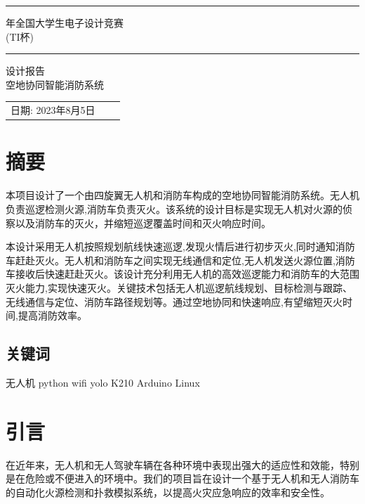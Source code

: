 \documentclass[12pt, a4paper, oneside]{article}
\begin{document}
\begin{center}
    \rule{\textwidth}{1pt}\par
    \vspace{5mm}
    {\fontsize{25pt}{30} 年全国大学生电子设计竞赛}\\[\baselineskip]
    \fontsize{25pt}{30}\selectfont (TI杯)
    \rule{\textwidth}{1pt}\par
    \vspace{4cm}
    {\fontsize{25pt}{30}\selectfont 设计报告}\\[\baselineskip]

    {\fontsize{25pt}{30}\selectfont 空地协同智能消防系统}\\[\baselineskip]
\end{center}
\vspace{2cm}

\begin{tabular}{lll}

    日期: {2023年8月5日}
\end{tabular}

\newpage
\tableofcontents

\newpage
\section{摘要}

本项目设计了一个由四旋翼无人机和消防车构成的空地协同智能消防系统。无人机负责巡逻检测火源,消防车负责灭火。该系统的设计目标是实现无人机对火源的侦察以及消防车的灭火，并缩短巡逻覆盖时间和灭火响应时间。

本设计采用无人机按照规划航线快速巡逻,发现火情后进行初步灭火,同时通知消防车赶赴灭火。无人机和消防车之间实现无线通信和定位,无人机发送火源位置,消防车接收后快速赶赴灭火。该设计充分利用无人机的高效巡逻能力和消防车的大范围灭火能力,实现快速灭火。关键技术包括无人机巡逻航线规划、目标检测与跟踪、无线通信与定位、消防车路径规划等。通过空地协同和快速响应,有望缩短灭火时间,提高消防效率。

\subsection{关键词}

无人机 python wifi yolo K210 Arduino Linux

\section{引言}

在近年来，无人机和无人驾驶车辆在各种环境中表现出强大的适应性和效能，特别是在危险或不便进入的环境中。我们的项目旨在设计一个基于无人机和无人消防车的自动化火源检测和扑救模拟系统，以提高火灾应急响应的效率和安全性。
\end{document}
